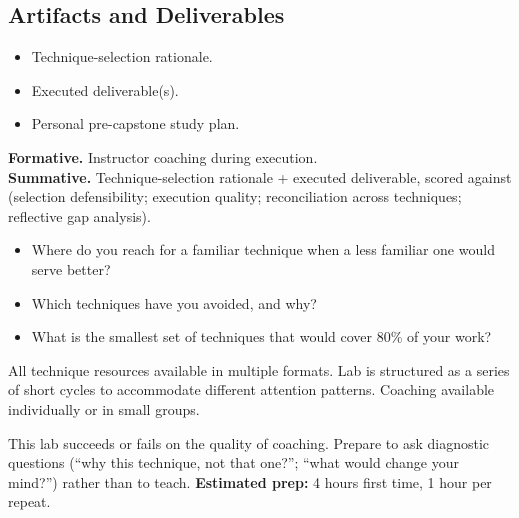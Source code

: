 \documentclass[11pt,letterpaper,oneside]{report}
\begin{document}
\subsection*{Artifacts and Deliverables}
\begin{itemize}
  \item Technique-selection rationale.
  \item Executed deliverable(s).
  \item Personal pre-capstone study plan.
\end{itemize}

\begin{curriculumassessment}
\textbf{Formative.} Instructor coaching during execution.\\[3pt]
\textbf{Summative.} Technique-selection rationale + executed deliverable, scored against  (selection defensibility; execution quality; reconciliation across techniques; reflective gap analysis).
\end{curriculumassessment}

\begin{curriculumreflection}
\begin{itemize}
  \item Where do you reach for a familiar technique when a less familiar one would serve better?
  \item Which techniques have you avoided, and why?
  \item What is the smallest set of techniques that would cover 80\% of your work?
\end{itemize}
\end{curriculumreflection}

\begin{curriculumnote}
All technique resources available in multiple formats. Lab is structured as a series of short cycles to accommodate different attention patterns. Coaching available individually or in small groups.
\end{curriculumnote}

\begin{curriculumteachingnotes}
This lab succeeds or fails on the quality of coaching. Prepare to ask diagnostic questions (``why this technique, not that one?''; ``what would change your mind?'') rather than to teach. \textbf{Estimated prep:} 4 hours first time, 1 hour per repeat.
\end{curriculumteachingnotes}

\end{document}
